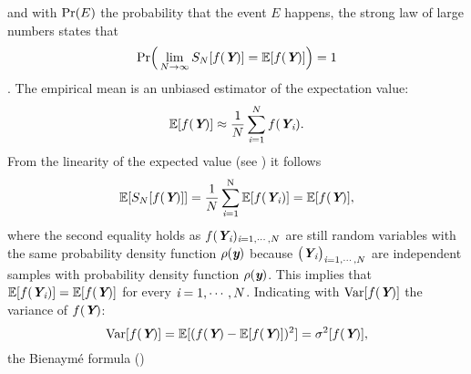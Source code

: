 and with $\textrm{Pr}(E)$ the probability that the event $E$ happens,
the strong law of large numbers states that
\begin{equation}
\textrm{Pr}\Big(\lim_{N\rightarrow\infty}S_{N}[f(\textit{\textbf{Y}})] = \mathbb{E}[f(\textit{\textbf{Y}})] \Big) = 1
\end{equation}
\cite{grinstead2012introduction}. The empirical mean is an unbiased estimator of the expectation value:
\begin{equation}\label{eq:approx_MC_QMC}
\mathbb{E}[f(\textit{\textbf{Y}})] \approx \frac{1}{N} \sum_{\textit{i}=1}^{N} f(\textit{\textbf{Y}}_{\textit{i}}).
\end{equation}
From the linearity of the expected value (see \cite{grinstead2012introduction})
 it follows
\begin{equation}\label{eq:linearity}
\mathbb{E}[S_{N}[f(\textit{\textbf{Y}})]] = \frac{1}{N}\sum_{\textit{i}=1}^{\textrm{N}}\mathbb{E}[f(\textit{\textbf{Y}}_{\textit{i}})] = \mathbb{E}[f(\textit{\textbf{Y}})],
\end{equation}
where the second equality holds as
$f(\textit{\textbf{Y}}_{\textit{i}})_{\textit{i}=1, \cdots, N}$ are still random variables with the same probability density function $\rho(\textit{\textbf{y}})$ because $\big(\textit{\textbf{Y}}_{\textit{i}}\big)_{\textit{i}=1, \cdots, N}$ are independent samples with probability density function $\rho(\textit{\textbf{y}})$. This implies that $\mathbb{E}[f(\textit{\textbf{Y}}_{\textit{i}})] = \mathbb{E}[f(\textit{\textbf{Y}})]$ for every $\textit{i}=1, \cdots, N$. Indicating with $\textrm{Var}[f(\textit{\textbf{Y}})]$ the variance of $f(\textit{\textbf{Y}})$:
\begin{equation}\textrm{Var}[f(\textit{\textbf{Y}})]=\mathbb{E}[(f(\textit{\textbf{Y}})-\mathbb{E}[f(\textit{\textbf{Y}})])^2] = \sigma^2[f(\textit{\textbf{Y}})],
\end{equation}
the Bienaym\'e formula (\cite{grinstead2012introduction})
